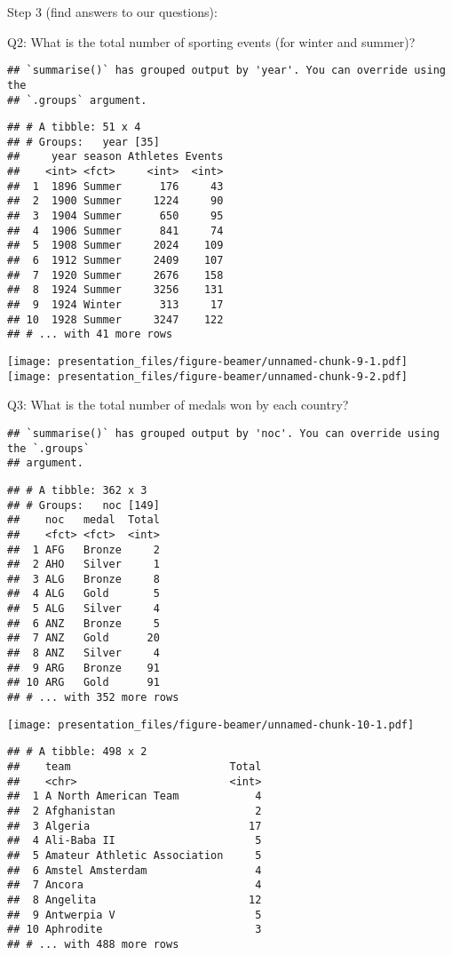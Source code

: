 \documentclass[
  ignorenonframetext,
]{beamer}
\begin{document}
\begin{frame}[fragile]{Step 3 (find answers to our questions):}
\begin{block}{Q2: What is the total number of sporting events (for
winter and summer)?}
\protect\hypertarget{q2-what-is-the-total-number-of-sporting-events-for-winter-and-summer}{}
\begin{verbatim}
## `summarise()` has grouped output by 'year'. You can override using the
## `.groups` argument.
\end{verbatim}

\begin{verbatim}
## # A tibble: 51 x 4
## # Groups:   year [35]
##     year season Athletes Events
##    <int> <fct>     <int>  <int>
##  1  1896 Summer      176     43
##  2  1900 Summer     1224     90
##  3  1904 Summer      650     95
##  4  1906 Summer      841     74
##  5  1908 Summer     2024    109
##  6  1912 Summer     2409    107
##  7  1920 Summer     2676    158
##  8  1924 Summer     3256    131
##  9  1924 Winter      313     17
## 10  1928 Summer     3247    122
## # ... with 41 more rows
\end{verbatim}

\texttt{[image: presentation\_files/figure-beamer/unnamed-chunk-9-1.pdf]}
\texttt{[image: presentation\_files/figure-beamer/unnamed-chunk-9-2.pdf]}
\end{block}

\begin{block}{Q3: What is the total number of medals won by each
country?}
\protect\hypertarget{q3-what-is-the-total-number-of-medals-won-by-each-country}{}
\begin{verbatim}
## `summarise()` has grouped output by 'noc'. You can override using the `.groups`
## argument.
\end{verbatim}

\begin{verbatim}
## # A tibble: 362 x 3
## # Groups:   noc [149]
##    noc   medal  Total
##    <fct> <fct>  <int>
##  1 AFG   Bronze     2
##  2 AHO   Silver     1
##  3 ALG   Bronze     8
##  4 ALG   Gold       5
##  5 ALG   Silver     4
##  6 ANZ   Bronze     5
##  7 ANZ   Gold      20
##  8 ANZ   Silver     4
##  9 ARG   Bronze    91
## 10 ARG   Gold      91
## # ... with 352 more rows
\end{verbatim}

\texttt{[image: presentation\_files/figure-beamer/unnamed-chunk-10-1.pdf]}

\begin{verbatim}
## # A tibble: 498 x 2
##    team                         Total
##    <chr>                        <int>
##  1 A North American Team            4
##  2 Afghanistan                      2
##  3 Algeria                         17
##  4 Ali-Baba II                      5
##  5 Amateur Athletic Association     5
##  6 Amstel Amsterdam                 4
##  7 Ancora                           4
##  8 Angelita                        12
##  9 Antwerpia V                      5
## 10 Aphrodite                        3
## # ... with 488 more rows
\end{verbatim}
\end{block}


\end{frame}
\end{document}
